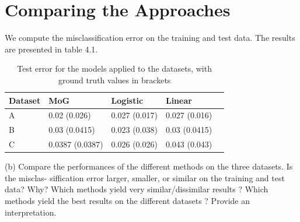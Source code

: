 \documentclass[paper=a4, fontsize=11pt]{scrartcl} %
\numberwithin{equation}{section} %
\numberwithin{figure}{section} %
\numberwithin{table}{section} %
\begin{document}
\section{Comparing the Approaches}
We compute the misclassification error on the training and test data.
The results are presented in table 4.1.
	\begin{table}
		\caption {Test error for the models applied to the datasets, with ground truth values in brackets} \label{tab:title} 
		\begin{center}		
			\begin{tabular}{*5l}   
				\toprule
				Dataset &  MoG & Logistic & Linear
				\\\midrule
				A & 0.02 (0.026) & 0.027 (0.017) & 0.027 (0.016) \\ 
				B & 0.03 (0.0415) & 0.023 (0.038) & 0.03 (0.0415) \\
				C & 0.0387 (0.0387) & 0.026 (0.026) & 0.043 (0.043) \\\bottomrule
				\hline
			\end{tabular}
		\end{center}
	\end{table}

(b) Compare the performances of the different methods on the three datasets. Is the misclas-
siffication error larger, smaller, or similar on the training and test data? Why? Which
methods yield very similar/dissimilar results ? Which methods yield the best results on
the different datasets ? Provide an interpretation.
	
	
\end{document}
